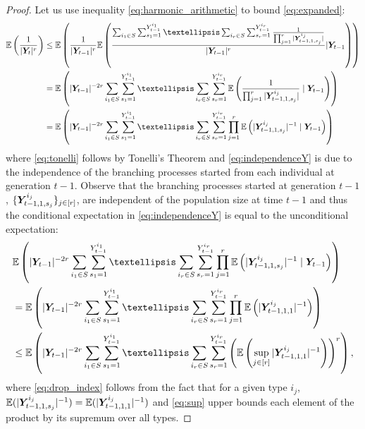 \documentclass[10pt,a4paper]{amsart}
\newcommand{\Y}[1][]{%
  \ifx\relax#1\relax
    \boldsymbol{Y}_{t-1, 1, s}^{i}%
  \else
    \boldsymbol{Y}_{t-1, 1, s_{#1}}^{i_{#1}}%
  \fi
}
\begin{document}
\begin{proof}
Let us use inequality \eqref{eq:harmonic_arithmetic} to bound \eqref{eq:expanded}:
\begin{align}
\mathbb{E}\left(\frac{1}{|\boldsymbol{Y}_t|^r}\right)
&\le \mathbb{E}\left(\frac{1}{|\boldsymbol{Y}_{t-1}|^r}\mathbb{E}\left(\frac{\sum_{i_1 \in S}\sum_{s_1=1}^{Y_{t-1}^{i_1}} \dots \sum_{i_r \in S}\sum_{s_r=1}^{Y_{t-1}^{i_r}}\frac{1}{\prod_{j=1}^r|\Y[j]|}}{|\boldsymbol{Y}_{t-1}|^r}| \boldsymbol{Y}_{t-1}\right)\right) \nonumber \\
& =\mathbb{E}\left(|\boldsymbol{Y}_{t-1}|^{-2r}\sum_{i_1 \in S}\sum_{s_1=1}^{Y_{t-1}^{i_1}} \dots \sum_{i_r \in S}\sum_{s_r=1}^{Y_{t-1}^{i_r}}\mathbb{E}\left(\frac{1}{\prod_{j=1}^r|\Y[j]|} \mid \boldsymbol{Y}_{t-1}\right)\right) \label{eq:tonelli}\\ 
& =\mathbb{E}\left(|\boldsymbol{Y}_{t-1}|^{-2r}\sum_{i_1 \in S}\sum_{s_1=1}^{Y_{t-1}^{i_1}} \dots \sum_{i_r \in S}\sum_{s_r=1}^{Y_{t-1}^{i_r}}\prod_{j=1}^r\mathbb{E}\left(|\Y[j]|^{-1} \mid \boldsymbol{Y}_{t-1}\right)\right)\label{eq:independenceY}
\end{align}%
where \eqref{eq:tonelli} follows by Tonelli's Theorem and \eqref{eq:independenceY} is due to the independence of the branching processes started from each individual at generation $t-1$. Observe that the branching processes started at generation $t-1$, $\{\Y[j]\}_{j \in [r]}$, are independent of the population size at time $t-1$ and thus the conditional expectation in \eqref{eq:independenceY} is equal to the unconditional expectation:
\begin{align}
&\mathbb{E}\left(|\boldsymbol{Y}_{t-1}|^{-2r}\sum_{i_1 \in S}\sum_{s_1=1}^{Y_{t-1}^{i_1}} \dots \sum_{i_r \in S}\sum_{s_r=1}^{Y_{t-1}^{i_r}}\prod_{j=1}^r\mathbb{E}\left(|\Y[j]|^{-1} \mid \boldsymbol{Y}_{t-1}\right)\right) \nonumber\\ 
& =\mathbb{E}\left(|\boldsymbol{Y}_{t-1}|^{-2r}\sum_{i_1 \in S}\sum_{s_1=1}^{Y_{t-1}^{i_1}} \dots \sum_{i_r \in S}\sum_{s_r=1}^{Y_{t-1}^{i_r}}\prod_{j=1}^r\mathbb{E}\left(|\boldsymbol{Y}_{t-1,1,1}^{i_j}|^{-1}\right)\right) \label{eq:drop_index}\\
& \le\mathbb{E}\left(|\boldsymbol{Y}_{t-1}|^{-2r}\sum_{i_1 \in S}\sum_{s_1=1}^{Y_{t-1}^{i_1}} \dots \sum_{i_r \in S}\sum_{s_r=1}^{Y_{t-1}^{i_r}}\left(\mathbb{E}\left(\sup_{j \in [r]}|\boldsymbol{Y}_{t-1,1,1}^{i_j}|^{-1}\right)\right)^r\right), \label{eq:sup} 
\end{align}
where \eqref{eq:drop_index} follows from the fact that for a given type $i_j$, $\mathbb{E}(|\Y[j]|^{-1}) = \mathbb{E}(|\boldsymbol{Y}_{t-1,1,1}^{i_j}|^{-1})$ and \eqref{eq:sup} upper bounds each element of the product by its supremum over all types.


\end{proof}
\end{document}
